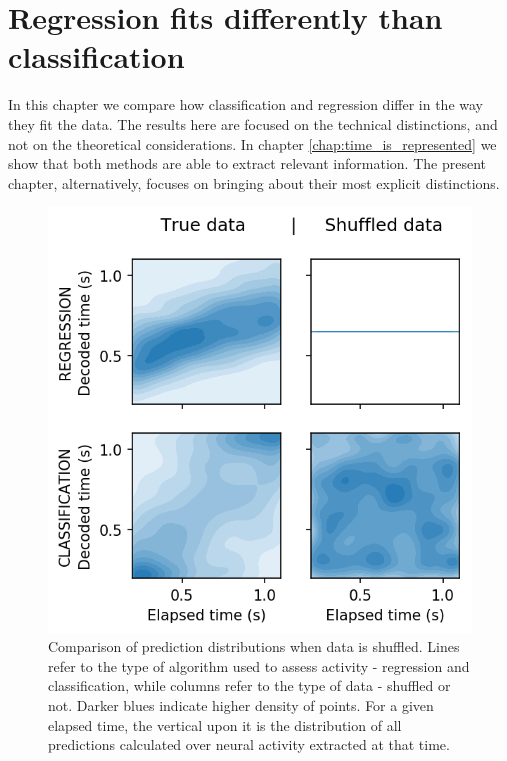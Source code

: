 \chapter{Regression fits differently than classification}
\label{chap:metrics}

In this chapter we compare how classification and regression differ in the way they fit the data. The results here are focused on the technical distinctions, and not on the theoretical considerations. In chapter \ref{chap:time_is_represented} we show that both methods are able to extract relevant information. The present chapter, alternatively, focuses on bringing about their most explicit distinctions. 


\begin{figure}[ht]
    \centering
    \includegraphics{figures/decoding_kde_bootstrap_vs_true_31.png}
    \caption[Comparison of prediction distributions when data is shuffled]{Comparison of prediction distributions when data is shuffled. Lines refer to the type of algorithm used to assess activity - regression and classification, while columns refer to the type of data - shuffled or not. Darker blues indicate higher density of points. For a given elapsed time, the vertical upon it is the distribution of all predictions calculated over neural activity extracted at that time.}
    \label{fig:decoding_kde_boot}
\end{figure}

